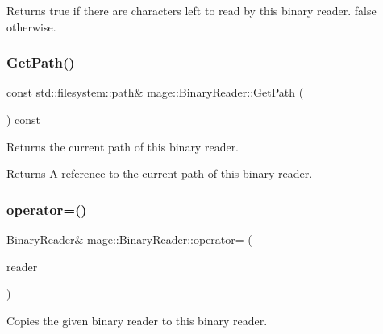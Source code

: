 \begin{DoxyReturn}{Returns}
{\ttfamily true} if there are characters left to read by this binary reader. {\ttfamily false} otherwise. 
\end{DoxyReturn}
\mbox{\label{classmage_1_1_binary_reader_af2c3f4e6a98472a6435dd9d1105b4bc9}} 
\subsubsection{\texorpdfstring{Get\+Path()}{GetPath()}}
{\footnotesize\ttfamily const std\+::filesystem\+::path\& mage\+::\+Binary\+Reader\+::\+Get\+Path (\begin{DoxyParamCaption}{ }\end{DoxyParamCaption}) const\hspace{0.3cm}{\ttfamily [noexcept]}}

Returns the current path of this binary reader.

\begin{DoxyReturn}{Returns}
A reference to the current path of this binary reader. 
\end{DoxyReturn}
\mbox{\label{classmage_1_1_binary_reader_a0408bb456983b4a03ae42ab69c6f4bc3}} 
\subsubsection{\texorpdfstring{operator=()}{operator=()}\hspace{0.1cm}{\footnotesize\ttfamily [1/2]}}
{\footnotesize\ttfamily \mbox{\hyperlink{classmage_1_1_binary_reader}{Binary\+Reader}}\& mage\+::\+Binary\+Reader\+::operator= (\begin{DoxyParamCaption}\item[{const \mbox{\hyperlink{classmage_1_1_binary_reader}{Binary\+Reader}} \&}]{reader }\end{DoxyParamCaption})\hspace{0.3cm}{\ttfamily [delete]}}

Copies the given binary reader to this binary reader.


